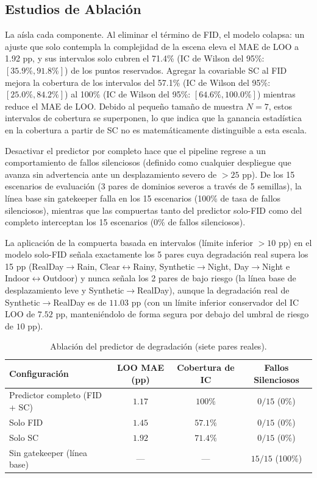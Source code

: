 \documentclass[10pt,twocolumn,letterpaper]{article}
\begin{document}
\subsection{Estudios de Ablación}
La  aísla cada componente. Al eliminar el término de FID, el modelo colapsa: un ajuste que solo contempla la complejidad de la escena eleva el MAE de LOO a 1.92 pp, y sus intervalos solo cubren el 71.4\% (IC de Wilson del 95\%: $[35.9\%, 91.8\%]$) de los puntos reservados. Agregar la covariable SC al FID mejora la cobertura de los intervalos del 57.1\% (IC de Wilson del 95\%: $[25.0\%, 84.2\%]$) al 100\% (IC de Wilson del 95\%: $[64.6\%, 100.0\%]$) mientras reduce el MAE de LOO. Debido al pequeño tamaño de muestra $N=7$, estos intervalos de cobertura se superponen, lo que indica que la ganancia estadística en la cobertura a partir de SC no es matemáticamente distinguible a esta escala.

Desactivar el predictor por completo hace que el pipeline regrese a un comportamiento de fallos silenciosos (definido como cualquier despliegue que avanza sin advertencia ante un desplazamiento severo de $> 25$ pp). De los 15 escenarios de evaluación (3 pares de dominios severos a través de 5 semillas), la línea base sin gatekeeper falla en los 15 escenarios (100\% de tasa de fallos silenciosos), mientras que las compuertas tanto del predictor solo-FID como del completo interceptan los 15 escenarios (0\% de fallos silenciosos).

La aplicación de la compuerta basada en intervalos (límite inferior $> 10$ pp) en el modelo solo-FID señala exactamente los 5 pares cuya degradación real supera los 15 pp (RealDay$\rightarrow$Rain, Clear$\leftrightarrow$Rainy, Synthetic$\rightarrow$Night, Day$\rightarrow$Night e Indoor$\leftrightarrow$Outdoor) y nunca señala los 2 pares de bajo riesgo (la línea base de desplazamiento leve y Synthetic$\rightarrow$RealDay), aunque la degradación real de Synthetic$\rightarrow$RealDay es de $11.03$ pp (con un límite inferior conservador del IC LOO de $7.52$ pp, manteniéndolo de forma segura por debajo del umbral de riesgo de $10$ pp).

\begin{table}[htbp]
\centering
\caption{Ablación del predictor de degradación (siete pares reales).}
\label{tab:ablation}
\begin{tabular}{@{}lccc@{}}
\toprule
\textbf{Configuración} & \textbf{LOO MAE (pp)} & \textbf{Cobertura de IC} & \textbf{Fallos Silenciosos} \\
\midrule
Predictor completo (FID + SC) & $1.17$ & $100\%$ & $0/15$ (0\%) \\
Solo FID & $1.45$ & $57.1\%$ & $0/15$ (0\%) \\
Solo SC & $1.92$ & $71.4\%$ & $0/15$ (0\%) \\
Sin gatekeeper (línea base) & --- & --- & $15/15$ (100\%) \\
\bottomrule
\end{tabular}
\end{table}
\end{document}

